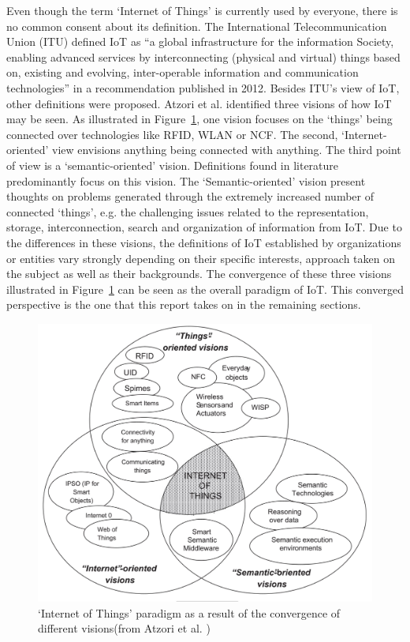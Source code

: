 	Even though the term `Internet of Things' is currently used by everyone, there is no common consent about its definition. The International Telecommunication Union (ITU) defined IoT as ``a global infrastructure for the information Society, enabling advanced services by interconnecting (physical and virtual) things based on, existing and evolving, inter-operable information and communication technologies'' \cite[p.~1]{itu} in a recommendation published in 2012. Besides ITU's view of IoT, other definitions were proposed. Atzori et al. \cite{atzori} identified three visions of how IoT may be seen. As illustrated in Figure~\ref{fig:iot_visions}, one vision focuses on the `things' being connected over technologies like RFID, WLAN or NCF. The second, `Internet-oriented' view envisions anything being connected with anything. The third point of view is a `semantic-oriented' vision. Definitions found in literature predominantly focus on this vision. The `Semantic-oriented' vision present thoughts on problems generated through the extremely increased number of connected `things', e.g. the challenging issues related to the representation, storage, interconnection, search and organization of information from IoT. Due to the differences in these visions, the definitions of IoT established by organizations or entities vary strongly depending on their specific interests, approach taken on the subject as well as their backgrounds. The convergence of these three visions illustrated in Figure~\ref{fig:iot_visions} can be seen as the overall paradigm of IoT. This converged perspective is the one that this report takes on in the remaining sections. 

	\begin{figure}[ht]
	    \begin{center}
	    \includegraphics[scale=0.35]{Talk11/iot_visions.jpg}
	    \end{center}
	    \caption{`Internet of Things' paradigm as a result of the convergence of different visions(from Atzori et al. \cite{atzori})}
	    \label{fig:iot_visions}
    \end{figure}


